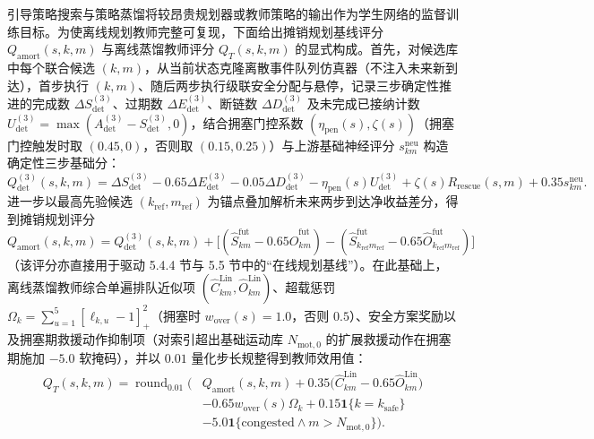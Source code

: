 引导策略搜索与策略蒸馏将较昂贵规划器或教师策略的输出作为学生网络的监督训练目标\cite{levine2013guided,rusu2015distillation}。为使离线规划教师完整可复现，下面给出摊销规划基线评分 $Q_{\mathrm{amort}}(s,k,m)$ 与离线蒸馏教师评分 $Q_T(s,k,m)$ 的显式构成。首先，对候选库中每个联合候选 $(k,m)$，从当前状态克隆离散事件队列仿真器（不注入未来新到达），首步执行 $(k,m)$、随后两步执行级联安全分配与悬停，记录三步确定性推进的完成数 $\Delta S_{\mathrm{det}}^{(3)}$、过期数 $\Delta E_{\mathrm{det}}^{(3)}$、断链数 $\Delta D_{\mathrm{det}}^{(3)}$ 及未完成已接纳计数 $U_{\mathrm{det}}^{(3)}=\max(A_{\mathrm{det}}^{(3)}-S_{\mathrm{det}}^{(3)},0)$，结合拥塞门控系数 $(\eta_{\mathrm{pen}}(s),\zeta(s))$（拥塞门控触发时取 $(0.45,0)$，否则取 $(0.15,0.25)$）与上游基础神经评分 $s_{km}^{\mathrm{neu}}$ 构造确定性三步基础分：
\begin{equation}
 Q_{\mathrm{det}}^{(3)}(s,k,m)=\Delta S_{\mathrm{det}}^{(3)}-0.65\Delta E_{\mathrm{det}}^{(3)}-0.05\Delta D_{\mathrm{det}}^{(3)}-\eta_{\mathrm{pen}}(s)U_{\mathrm{det}}^{(3)}+\zeta(s)R_{\mathrm{rescue}}(s,m)+0.35s_{km}^{\mathrm{neu}}.
 \label{eq:ch5-det-rollout-score}
\end{equation}
进一步以最高先验候选 $(k_{\mathrm{ref}},m_{\mathrm{ref}})$ 为锚点叠加解析未来两步到达净收益差分，得到摊销规划评分 $Q_{\mathrm{amort}}(s,k,m)=Q_{\mathrm{det}}^{(3)}(s,k,m)+\big[(\widehat{S}_{km}^{\mathrm{fut}}-0.65\widehat{O}_{km}^{\mathrm{fut}})-(\widehat{S}_{k_{\mathrm{ref}}m_{\mathrm{ref}}}^{\mathrm{fut}}-0.65\widehat{O}_{k_{\mathrm{ref}}m_{\mathrm{ref}}}^{\mathrm{fut}})\big]$（该评分亦直接用于驱动 5.4.4 节与 5.5 节中的“在线规划基线”）。在此基础上，离线蒸馏教师综合单遍排队近似项 $(\widehat{C}_{km}^{\mathrm{Lin}},\widehat{O}_{km}^{\mathrm{Lin}})$、超载惩罚 $\Omega_k=\sum_{u=1}^5[\ell_{k,u}-1]_+^2$（拥塞时 $w_{\mathrm{over}}(s)=1.0$，否则 $0.5$）、安全方案奖励以及拥塞期救援动作抑制项（对索引超出基础运动库 $N_{\mathrm{mot},0}$ 的扩展救援动作在拥塞期施加 $-5.0$ 软掩码），并以 $0.01$ 量化步长规整得到教师效用值：
\begin{equation}
 \begin{aligned}
 Q_T(s,k,m)=\operatorname{round}_{0.01}\Big(&Q_{\mathrm{amort}}(s,k,m)+0.35\big(\widehat{C}_{km}^{\mathrm{Lin}}-0.65\widehat{O}_{km}^{\mathrm{Lin}}\big)\\
 &-0.65w_{\mathrm{over}}(s)\Omega_k+0.15\mathbf{1}\{k=k_{\mathrm{safe}}\}\\
 &-5.0\mathbf{1}\{\mathrm{congested}\land m>N_{\mathrm{mot},0}\}\Big).
 \end{aligned}
 \label{eq:ch5-teacher-score}
\end{equation}

